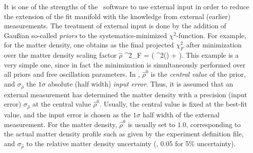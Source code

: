 It is one of the strengths of the \GLOBES\ software to use external input 
in order to reduce the extension of the fit manifold with the knowledge 
from external
(earlier) measurements. The treatment of external input is done by the 
addition of Gau\ss ian so-called {\em priors} to the systematics-minimized 
$\chi^2$-function. For example, for the matter density, one obtains as the 
final projected $\chi^2_F$ after minimization over the matter density
scaling factor  $\hat{\rho}$
\be
 \chi^2_F =  \left( \chi^2(\hat{\rho}) +
  \right).
\label{equ:priors}
\ee
This example is a very simple one, since in fact the
minimization is simultaneously performed over all priors and free oscillation 
parameters. In , $\hat{\rho}^0$ is the {\em central value} of the 
prior, and $\sigma_{\hat{\rho}}$ the $1 \sigma$ absolute (half width) 
{\em input error}. Thus, it is assumed that an external measurement has 
determined the matter density with a precision (input error) 
$\sigma_{\hat{\rho}}$ at the central value $\hat{\rho}^0$. Usually, 
the central value is fixed at the best-fit value, and the input error 
is chosen as the $1 \sigma$ half width of the external measurement. For the matter 
density, $\hat{\rho}^0$  is usually set to $1.0$, corresponding to
the actual matter density profile such as given by the experiment
 definition file, and $\sigma_{\hat{\rho}}$ to the 
relative matter density uncertainty (\eg, $0.05$ for 5\% uncertainty).

